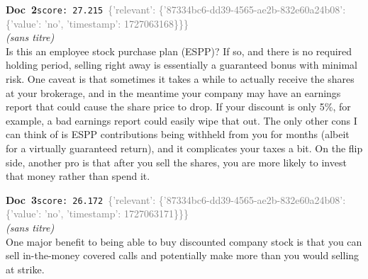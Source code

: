 \documentclass[a4paper,11pt]{article}
\begin{document}
\begin{docenv}
{\footnotesize\textcolor{doccolor}{\textbf{Doc~2}}}\hfill{\tiny\texttt{score:~27.215}}\ {\tiny\textcolor{gray}{\{'relevant': \{'87334bc6-dd39-4565-ae2b-832e60a24b08': \{'value': 'no', 'timestamp': 1727063168\}\}\}}}\\[3pt]
{\small\textit{(sans titre)}}\\[2pt]
\vspace{2pt}
{\footnotesize 
Is this an employee stock purchase plan (ESPP)? If so, and there is no required holding period, selling right away is essentially a guaranteed bonus with minimal risk. One caveat is that sometimes it takes a while to actually receive the shares at your brokerage, and in the meantime your company may have an earnings report that could cause the share price to drop. If your discount is only 5\%, for example, a bad earnings report could easily wipe that out. The only other cons I can think of is ESPP contributions being withheld from you for months (albeit for a virtually guaranteed return), and it complicates your taxes a bit. On the flip side, another pro is that after you sell the shares, you are more likely to invest that money rather than spend it.}
\end{docenv}
\begin{docenv}
{\footnotesize\textcolor{doccolor}{\textbf{Doc~3}}}\hfill{\tiny\texttt{score:~26.172}}\ {\tiny\textcolor{gray}{\{'relevant': \{'87334bc6-dd39-4565-ae2b-832e60a24b08': \{'value': 'no', 'timestamp': 1727063171\}\}\}}}\\[3pt]
{\small\textit{(sans titre)}}\\[2pt]
\vspace{2pt}
{\footnotesize 
One major benefit to being able to buy discounted company stock is that you can sell in-the-money covered calls and potentially make more than you would selling at strike.}
\end{docenv}
\end{document}
